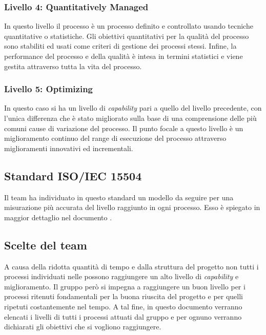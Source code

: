 \subsubsection{Livello 4: Quantitatively Managed}
In questo livello il processo è un processo definito e controllato usando tecniche quantitative o statistiche. Gli obiettivi quantitativi per la qualità del processo sono stabiliti ed usati come criteri di gestione dei processi stessi. Infine, la performance del processo e della qualità è intesa in termini statistici e viene gestita attraverso tutta la vita del processo.

\subsubsection{Livello 5: Optimizing}
In questo caso si ha un livello di \textit{capability} pari a quello del livello precedente, con l'unica differenza che è stato migliorato sulla base di una comprensione delle più comuni cause di variazione del processo. Il punto focale a questo livello è un miglioramento continuo del range di esecuzione del processo attraverso miglioramenti innovativi ed incrementali.

\subsection{Standard ISO/IEC 15504}
Il team ha individuato in questo standard un modello da seguire per una misurazione più accurata del livello raggiunto in ogni processo. Esso è spiegato in maggior dettaglio nel documento \NdP.

\subsection{Scelte del team}
A causa della ridotta quantità di tempo e dalla struttura del progetto non tutti i processi individuati nelle \NdP{} possono raggiungere un alto livello di \textit{capability} e miglioramento. Il gruppo però si impegna a raggiungere un buon livello per i processi ritenuti fondamentali per la buona riuscita del progetto e per quelli ripetuti costantemente nel tempo. A tal fine, in questo documento verranno elencati i livelli di tutti i processi attuati dal gruppo e per ognuno verranno dichiarati gli obiettivi che si vogliono raggiungere.

\newpage